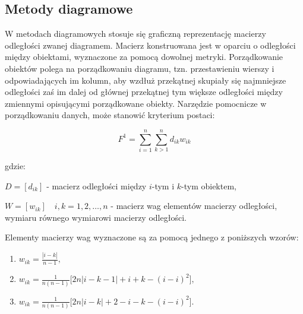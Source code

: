 \documentclass[12pt,a4paper]{report}
\begin{document}
\subsection{Metody diagramowe}


W metodach diagramowych stosuje się graficzną reprezentację macierzy odległości zwanej diagramem. Macierz konstruowana jest w oparciu o odległości między obiektami, wyznaczone za pomocą dowolnej metryki. Porządkowanie obiektów polega na porządkowaniu diagramu, tzn. przestawieniu wierszy i odpowiadających im kolumn, aby wzdłuż przekątnej skupiały się najmniejsze odległości zaś im dalej od głównej przekątnej tym większe odległości między zmiennymi opisującymi porządkowane obiekty.  %
Narzędzie pomocnicze w porządkowaniu danych, może stanowić kryterium postaci:


$$
F^1= \sum_{i=1}^{n} \sum_{k>1}^{n} d_{ik}w_{ik}
$$

gdzie:

$D=[d_{ik}]$ - macierz odległości między $i$-tym i $k$-tym obiektem,
 
$W=[w_{ik}] \quad i,k=1, 2, \ldots, n$ - macierz wag elementów macierzy odległości, wymiaru równego wymiarowi macierzy odległości.
 

Elementy macierzy wag wyznaczone są za pomocą jednego z poniższych wzorów:
\begin{enumerate}[label=(\alph*)]
\item $w_{ik}=\frac{| i-k |}{n-1}, \qquad$
\item $w_{ik}=\frac{1}{n(n-1)}\lbrack{2n|i-k-1|+i+k-(i-i)^2\rbrack},$
\item $w_{ik}=\frac{1}{n(n-1)}\lbrack{2n|i-k|+2-i-k-(i-i)^2\rbrack}.$
\end{enumerate}
%
% 
\end{document}

